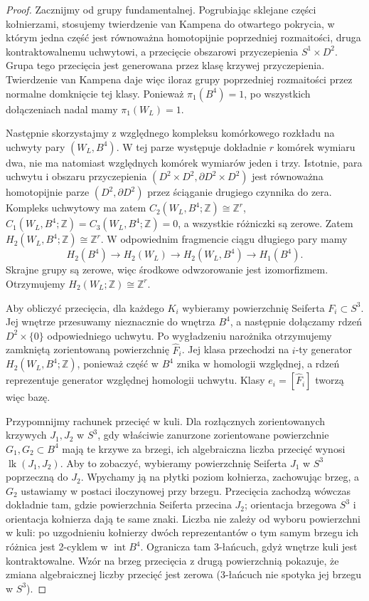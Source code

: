 \begin{proof}
Zacznijmy od grupy fundamentalnej. Pogrubiając
sklejane części kołnierzami, stosujemy twierdzenie
van Kampena do otwartego pokrycia, w którym jedna
część jest równoważna homotopijnie poprzedniej
rozmaitości, druga kontraktowalnemu uchwytowi,
a przecięcie obszarowi przyczepienia
$S^1\times D^2$. Grupa tego przecięcia jest
generowana przez klasę krzywej przyczepienia.
Twierdzenie van Kampena daje więc iloraz grupy
poprzedniej rozmaitości przez normalne domknięcie
tej klasy. Ponieważ $\pi_1(B^4)=1$,
po wszystkich dołączeniach nadal mamy $\pi_1(W_L)=1$.

Następnie skorzystajmy z względnego kompleksu komórkowego
rozkładu na uchwyty pary $(W_L,B^4)$.
W tej parze występuje dokładnie $r$ komórek wymiaru dwa,
nie ma natomiast względnych komórek wymiarów jeden i trzy.
Istotnie, para uchwytu i obszaru przyczepienia
$(D^2\times D^2,\partial D^2\times D^2)$ jest
równoważna homotopijnie parze $(D^2,\partial D^2)$
przez ściąganie drugiego czynnika do zera.
Kompleks uchwytowy ma zatem
$C_2(W_L,B^4;\mathbb Z)\cong\mathbb Z^r$,
$C_1(W_L,B^4;\mathbb Z)=C_3(W_L,B^4;\mathbb Z)=0$,
a wszystkie różniczki są zerowe. Zatem
$H_2(W_L,B^4;\mathbb Z)\cong\mathbb Z^r$.
W odpowiednim fragmencie ciągu długiego pary mamy
\[
H_2(B^4)\longrightarrow H_2(W_L)
\longrightarrow H_2(W_L,B^4)
\longrightarrow H_1(B^4).
\]
Skrajne grupy są zerowe, więc środkowe odwzorowanie
jest izomorfizmem. Otrzymujemy
$H_2(W_L;\mathbb Z)\cong\mathbb Z^r$.

Aby obliczyć przecięcia, dla każdego $K_i$ wybieramy
powierzchnię Seiferta $F_i\subset S^3$. Jej wnętrze
przesuwamy nieznacznie do wnętrza $B^4$, a następnie
dołączamy rdzeń $D^2\times\{0\}$ odpowiedniego uchwytu.
Po wygładzeniu narożnika otrzymujemy zamkniętą
zorientowaną powierzchnię $\widehat F_i$.
Jej klasa przechodzi na $i$-ty generator
$H_2(W_L,B^4;\mathbb Z)$, ponieważ część w $B^4$
znika w homologii względnej, a rdzeń reprezentuje
generator względnej homologii uchwytu.
Klasy $e_i=[\widehat F_i]$ tworzą więc bazę.

Przypomnijmy rachunek przecięć w kuli.
Dla rozłącznych zorientowanych krzywych $J_1,J_2$
w $S^3$, gdy właściwie zanurzone zorientowane
powierzchnie $G_1,G_2\subset B^4$ mają te krzywe
za brzegi, ich algebraiczna liczba przecięć
wynosi $\operatorname{lk}(J_1,J_2)$.
Aby to zobaczyć, wybieramy powierzchnię Seiferta
$J_1$ w $S^3$ poprzeczną do $J_2$. Wpychamy ją
na płytki poziom kołnierza, zachowując brzeg,
a $G_2$ ustawiamy w postaci iloczynowej przy brzegu.
Przecięcia zachodzą wówczas dokładnie tam, gdzie
powierzchnia Seiferta przecina $J_2$; orientacja
brzegowa $S^3$ i orientacja kołnierza dają te same
znaki. Liczba nie zależy od wyboru powierzchni
w kuli: po uzgodnieniu kołnierzy dwóch
reprezentantów o tym samym brzegu ich różnica
jest 2-cyklem w $\operatorname{int}B^4$.
Ogranicza tam 3-łańcuch, gdyż wnętrze kuli
jest kontraktowalne. Wzór na brzeg przecięcia
z drugą powierzchnią pokazuje, że zmiana
algebraicznej liczby przecięć jest zerowa
(3-łańcuch nie spotyka jej brzegu w $S^3$).


\end{proof}
